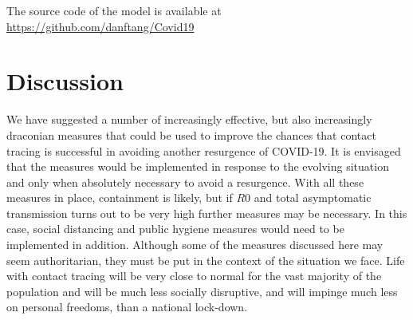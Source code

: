\documentclass{article}
\begin{document}
The source code of the model is available at \href{https://github.com/danftang/Covid19}{https://github.com/danftang/Covid19}

\section{Discussion}

We have suggested a number of increasingly effective, but also increasingly draconian measures that could be used to improve the chances that contact tracing is successful in avoiding another resurgence of COVID-19. It is envisaged that the measures would be implemented in response to the evolving situation and only when absolutely necessary to avoid a resurgence. With all these measures in place, containment is likely, but if $R0$ and total asymptomatic transmission turns out to be very high further measures may be necessary. In this case, social distancing and public hygiene measures would need to be implemented in addition. Although some of the measures discussed here may seem authoritarian, they must be put in the context of the situation we face. Life with contact tracing will be very close to normal for the vast majority of the population and will be much less socially disruptive, and will impinge much less on personal freedoms, than a national lock-down.

%

%
%
% 
%

\end{document}
